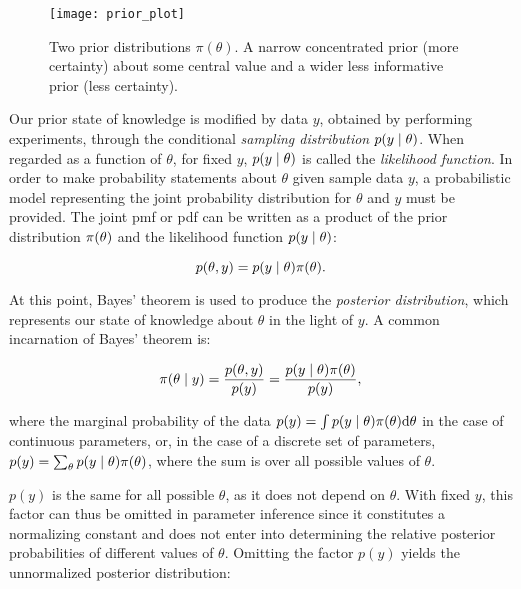 

\begin{figure}[H]
    \centering
    \texttt{[image: prior\_plot]}
    \caption{Two prior distributions $\pi (\theta)$. A narrow concentrated prior (more certainty) about some central value and a wider less informative prior (less certainty).}
    \label{fig:prior_illustration}
\end{figure}

Our prior state of knowledge is modified by data $y$, obtained by performing experiments, through the conditional \textit{sampling distribution} $p \qty(y \mid \theta)$. When regarded as a function of $\theta$, for fixed $y$, $p \qty(y \mid \theta)$ is called the \textit{likelihood function}. In order to make probability statements about $\theta$ given sample data $y$, a probabilistic model representing the joint probability distribution for $\theta$ and $y$ must be provided. The joint pmf or pdf can be written as a product of the prior distribution $\pi \qty(\theta)$ and the likelihood function $p \qty(y \mid \theta)$:

\begin{equation*}
    p(\theta, y) = p \qty(y \mid \theta) \pi \qty(\theta) .
\end{equation*}

At this point, Bayes' theorem is used to produce the \textit{posterior distribution}, which represents our state of knowledge about $\theta$ in the light of $y$. A common incarnation of Bayes' theorem is:

\begin{equation}\label{eq:bayes_theorem}
    \pi \qty(\theta \mid y) = \frac{p(\theta, y)}{p(y)}  = \frac{p \qty(y \mid \theta) \pi \qty(\theta)}{p(y)},
\end{equation}

where the marginal probability of the data $p(y) = \int p \qty(y \mid \theta) \pi \qty(\theta) \dd \theta$ in the case of continuous parameters, or, in the case of a discrete set of parameters, $p(y) = \sum_\theta p \qty(y \mid \theta) \pi \qty(\theta)$, where the sum is over all possible values of $\theta$.

$p(y)$ is the same for all possible $\theta$, as it does not depend on $\theta$. With fixed $y$, this factor can thus be omitted in parameter inference since it constitutes a normalizing constant and does not enter into determining the relative posterior probabilities of different values of $\theta$. Omitting the factor $p(y)$ yields the unnormalized posterior distribution: 

